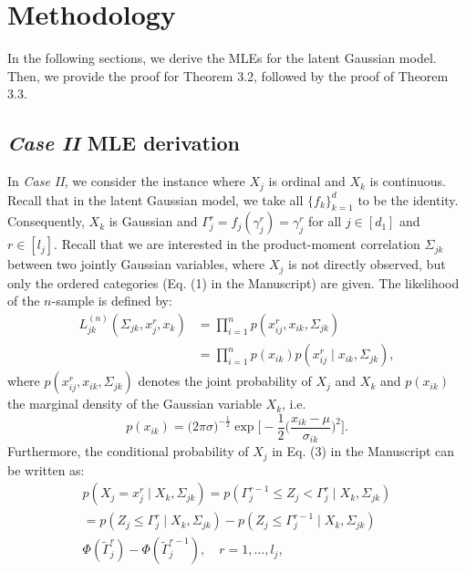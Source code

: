 
\section{Methodology}

In the following sections, we derive the MLEs for the latent Gaussian model. Then, we provide the proof for Theorem 3.2, followed by the proof of Theorem 3.3.

\subsection{\textit{Case II} MLE derivation}

In \textit{Case II}, we consider the instance where $X_j$ is ordinal and $X_k$ is continuous. Recall that in the latent Gaussian model, we take all \(\{f_k\}_{k=1}^d\) to be the identity. Consequently, \(X_k\) is Gaussian and \(\Gamma_j^r = f_j(\gamma_j^r) = \gamma_j^r\) for all \(j \in [d_1]\) and \(r \in [l_j]\). Recall that we are interested in the product-moment correlation $\Sigma_{jk}$ between two jointly Gaussian variables, where $X_j$ is not directly observed, but only the ordered categories (Eq. (1) in the Manuscript) are given. The likelihood of the $n$-sample is defined by:
\begin{equation}\label{polyserial_likelihood_appendix}
    \begin{split}
        L_{jk}^{(n)}(\Sigma_{jk}, x_j^r,x_k) &= \prod_{i=1}^n p(x_{ij}^{r},x_{ik}, \Sigma_{jk}) \\
        &= \prod_{i=1}^n p(x_{ik})p(x_{ij}^{r} \mid x_{ik}, \Sigma_{jk}),
    \end{split}
\end{equation}
where $p(x_{ij}^{r},x_{ik}, \Sigma_{jk})$ denotes the joint probability of  $X_j$ and $X_k$ and $p(x_{ik})$ the marginal density of the Gaussian variable $X_k$, i.e.
\begin{equation*}\label{marginal_normal}
    p(x_{ik}) = \big(2\pi\sigma\big)^{-\frac{1}{2}} \exp\Bigg[-\frac{1}{2}\bigg(\frac{x_{ik} - \mu}{\sigma_{ik}}\bigg)^2\Bigg].
\end{equation*}
Furthermore, the conditional probability of $X_j$ in Eq. %
(3) in the Manuscript can be written as:
\begin{equation}\label{threshold_conditionalprob}
    \begin{split}
        p(X_j = x_j^r \mid X_k, \Sigma_{jk}) = p(\Gamma_j^{r-1} \leq Z_j < \Gamma_j^r \mid X_k, \Sigma_{jk}) \\
        = p(Z_j \leq \Gamma_j^{r} \mid X_k, \Sigma_{jk}) - p(Z_j \leq \Gamma_j^{r-1} \mid X_k, \Sigma_{jk}) \\
        \Phi(\tilde{\Gamma}_j^{r}) - \Phi(\tilde{\Gamma}_j^{r-1}), \quad r = 1, \dots, l_{j},
    \end{split}
\end{equation}
